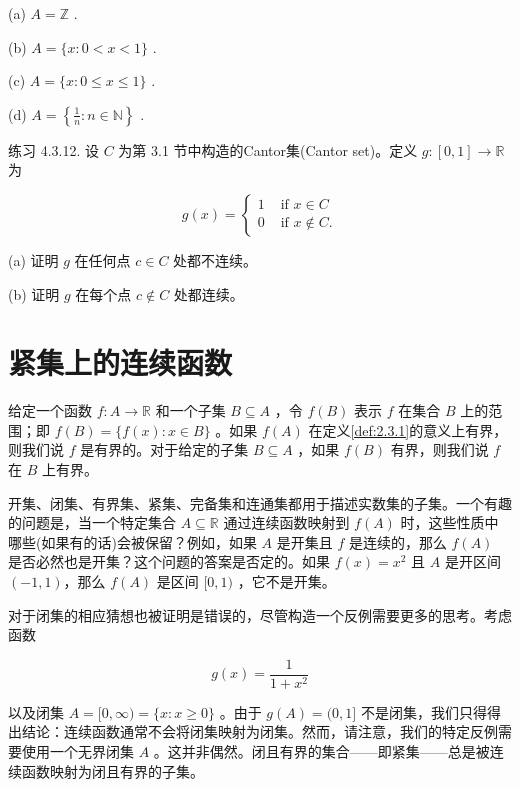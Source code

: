 (a) \(A = \mathbb{Z}\) .

(b) \(A = \{ x : 0 < x < 1\}\) .

(c) \(A = \{ x : 0 \leq  x \leq  1\}\) .

(d) \(A = \left\{  {\frac{1}{n} : n \in  \mathbb{N}}\right\}\) .

练习 4.3.12. 设 \(C\) 为第 3.1 节中构造的Cantor集(Cantor set)。定义 \(g : \left\lbrack  {0,1}\right\rbrack   \rightarrow  \mathbb{R}\) 为

\[
g\left( x\right)  = \left\{  \begin{array}{ll} 1 & \text{ if }x \in  C \\  0 & \text{ if }x \notin  C. \end{array}\right.
\]

(a) 证明 \(g\) 在任何点 \(c \in  C\) 处都不连续。

(b) 证明 \(g\) 在每个点 \(c \notin  C\) 处都连续。

\section{紧集上的连续函数}
\label{sec:4.4}
\begin{Def}
  \label{def:4.4.1}
  给定一个函数 \(f : A \rightarrow  \mathbb{R}\) 和一个子集 \(B \subseteq  A\) ，令 \(f\left( B\right)\) 表示 \(f\) 在集合 \(B\) 上的范围；即 \(f\left( B\right)  = \{ f\left( x\right)  : x \in  B\}\) 。如果 \(f\left( A\right)\) 在定义\ref{def:2.3.1}的意义上有界，则我们说 \(f\) 是有界的。对于给定的子集 \(B \subseteq  A\) ，如果 \(f\left( B\right)\) 有界，则我们说 \(f\) 在 \(B\) 上有界。
\end{Def}


开集、闭集、有界集、紧集、完备集和连通集都用于描述实数集的子集。一个有趣的问题是，当一个特定集合 \(A \subseteq  \mathbb{R}\) 通过连续函数映射到 \(f\left( A\right)\) 时，这些性质中哪些(如果有的话)会被保留？例如，如果 \(A\) 是开集且 \(f\) 是连续的，那么 \(f\left( A\right)\) 是否必然也是开集？这个问题的答案是否定的。如果 \(f\left( x\right)  = {x}^{2}\) 且 \(A\) 是开区间$(-1,1)$，那么 \(f\left( A\right)\) 是区间 \(\lbrack 0,1)\) ，它不是开集。

对于闭集的相应猜想也被证明是错误的，尽管构造一个反例需要更多的思考。考虑函数

\[
g\left( x\right)  = \frac{1}{1 + {x}^{2}}
\]

以及闭集 \(A = \lbrack 0,\infty ) = \{ x : x \geq  0\}\) 。由于 \(g\left( A\right)  = (0,1\rbrack\) 不是闭集，我们只得得出结论：连续函数通常不会将闭集映射为闭集。然而，请注意，我们的特定反例需要使用一个无界闭集 \(A\) 。这并非偶然。闭且有界的集合——即紧集——总是被连续函数映射为闭且有界的子集。


